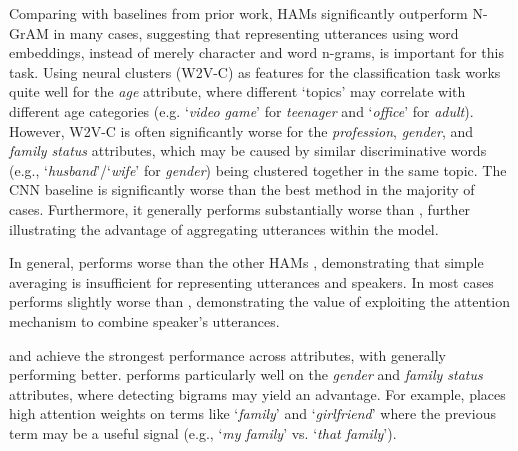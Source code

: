 Comparing with baselines from prior work, HAMs significantly outperform N-GrAM in many cases,
suggesting that representing utterances using word embeddings, instead of merely character and word n-grams, is important for this task. 
Using neural clusters (W2V-C) as features for the classification task \cite{pietro:ACL15} works quite well for the \textit{age} attribute, where different `topics' may correlate with different age categories (e.g. `\textit{video game}' for \textit{teenager} and `\textit{office}' for \textit{adult}).
However, W2V-C is often significantly worse for the \textit{profession}, \textit{gender}, and \textit{family status} attributes, which may be caused by similar discriminative words (e.g., `\textit{husband}'/`\textit{wife}' for \textit{gender}) being clustered together in the same topic.
The CNN baseline \cite{bayot:MOD17} is significantly worse than the best method in the majority of cases. Furthermore, it generally performs substantially worse than , further illustrating the advantage of aggregating utterances within the model.



In general,  performs worse than the other HAMs%
, demonstrating that simple averaging is insufficient
for representing utterances and speakers.
In most cases  performs slightly worse than , demonstrating
the value of exploiting the attention mechanism to combine speaker's utterances.

 and   
achieve the strongest performance across attributes, with  generally performing better.
 performs particularly well on the \textit{gender} and \textit{family status} attributes, where detecting bigrams may yield an advantage. For example,  places high attention weights on terms like `\textit{family}' and `\textit{girlfriend}' where the previous term may be a useful signal (e.g., `\textit{my family}' vs. `\textit{that family}').

